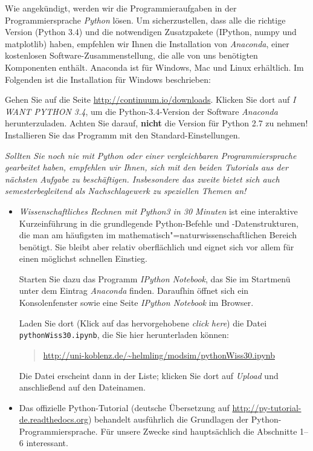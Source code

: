 \documentclass[german]{mhexsheet}
\begin{document}
\maketitle

\begin{exercise}[title=Python installieren]
Wie angekündigt, werden wir die Programmieraufgaben in der Programmiersprache \emph{Python} lösen. Um sicherzustellen, dass alle die richtige Version (Python 3.4) und die notwendigen Zusatzpakete (IPython, numpy und matplotlib) haben, empfehlen wir Ihnen die Installation von \emph{Anaconda}, einer kostenlosen Software-Zusammenstellung, die alle von uns benötigten Komponenten enthält. Anaconda ist für Windows, Mac und Linux erhältlich. Im Folgenden ist die Installation für Windows beschrieben:

Gehen Sie auf die Seite \url{http://continuum.io/downloads}. Klicken Sie dort auf \emph{I WANT PYTHON 3.4}, um die Python-3.4-Version der Software \emph{Anaconda} herunterzuladen. Achten Sie darauf, \textbf{nicht} die Version für Python 2.7 zu nehmen! Installieren Sie das Programm mit den Standard-Einstellungen.
\end{exercise}

\textit{Sollten Sie noch nie mit Python oder einer vergleichbaren Programmiersprache gearbeitet haben, empfehlen wir Ihnen, sich mit den beiden Tutorials aus der nächsten Aufgabe zu beschäftigen. Insbesondere das zweite bietet sich auch semesterbegleitend als Nachschlagewerk zu speziellen Themen an!}

\begin{exercise}[title=Erste Schritte mit Python]
\begin{itemize}
  \item \emph{Wissenschaftliches Rechnen mit Python3 in 30 Minuten} ist eine interaktive Kurzeinführung in die grundlegende Python-Befehle und -Datenstrukturen, die man am häufigsten im mathematisch"=naturwissenschaftlichen Bereich benötigt. Sie bleibt aber relativ oberflächlich und eignet sich vor allem für einen möglichst schnellen Einstieg.
  
  Starten Sie dazu das Programm \emph{IPython Notebook}, das Sie im Startmenü unter dem Eintrag \emph{Anaconda} finden. Daraufhin öffnet sich ein Konsolenfenster sowie eine Seite \emph{IPython Notebook} im Browser.

  Laden Sie dort (Klick auf das hervorgehobene \emph{click here}) die Datei \texttt{pythonWiss30.ipynb}, die Sie hier herunterladen können:
\begin{quote} \url{http://uni-koblenz.de/~helmling/modsim/pythonWiss30.ipynb} \end{quote}
Die Datei erscheint dann in der Liste; klicken Sie dort auf \emph{Upload} und anschließend auf den Dateinamen.
  \item Das offizielle Python-Tutorial (deutsche Übersetzung auf \url{http://py-tutorial-de.readthedocs.org}) behandelt ausführlich die Grundlagen der Python-Programmiersprache. Für unsere Zwecke sind hauptsächlich die Abschnitte 1–6 interessant.
\end{itemize}
\end{exercise}
\end{document}
